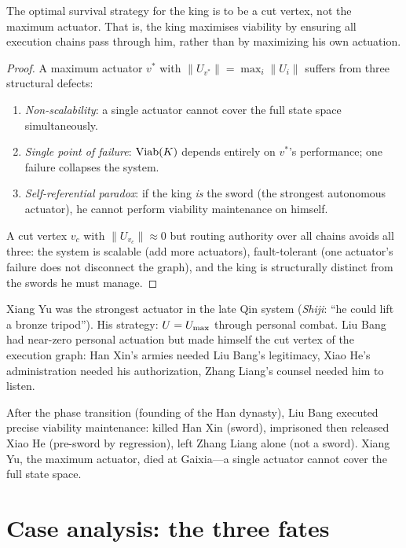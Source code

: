 \begin{theorem}\label{thm:cutvertex}
The optimal survival strategy for the king is to be a cut vertex, not
the maximum actuator. That is, the king maximises viability by
ensuring all execution chains pass through him, rather than by
maximizing his own actuation.
\end{theorem}

\begin{proof}
A maximum actuator $v^*$ with $\|U_{v^*}\| = \max_i \|U_i\|$
suffers from three structural defects:
\begin{enumerate}[label=(\roman*)]
  \item \emph{Non-scalability}: a single actuator cannot cover the
  full state space simultaneously.
  \item \emph{Single point of failure}: $\mathrm{Viab}(K)$ depends entirely
  on $v^*$'s performance; one failure collapses the system.
  \item \emph{Self-referential paradox}: if the king \emph{is} the
  sword (the strongest autonomous actuator), he cannot perform
  viability maintenance on himself.
\end{enumerate}
A cut vertex $v_c$ with $\|U_{v_c}\| \approx 0$ but routing
authority over all chains avoids all three: the system is scalable
(add more actuators), fault-tolerant (one actuator's failure does
not disconnect the graph), and the king is structurally distinct
from the swords he must manage.
\end{proof}

\begin{example}\label{ex:liubang}
Xiang Yu was the strongest actuator in the late Qin system
(\emph{Shiji}: ``he could lift a bronze tripod''). His strategy:
$U = U_{\max}$ through personal combat. Liu Bang had near-zero
personal actuation but made himself the cut vertex of the execution
graph: Han Xin's armies needed Liu Bang's legitimacy, Xiao He's
administration needed his authorization, Zhang Liang's counsel
needed him to listen.

After the phase transition (founding of the Han dynasty), Liu Bang
executed precise viability maintenance: killed Han Xin (sword),
imprisoned then released Xiao He (pre-sword by regression), left Zhang
Liang alone (not a sword). Xiang Yu, the maximum actuator, died at
Gaixia---a single actuator cannot cover the full state space.
\end{example}

\section{Case analysis: the three fates}\label{sec:cases}

